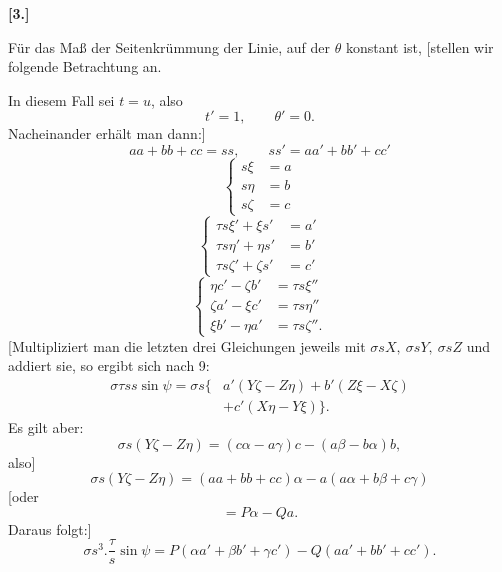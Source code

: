 %

\begin{center}\bfseries [3.]\end{center}
\noindent\hspace*{1.2em}Für das Maß der Seitenkrümmung der Linie, auf der $\theta$ konstant ist, [stellen wir folgende Betrachtung an.

In diesem Fall sei $t=u$, also
\[
t'=1,\qquad \theta'=0.
\]
Nacheinander erhält man dann:]
\begin{equation}\tag*{[$5'$]}
aa+bb+cc=ss,\qquad ss'=aa'+bb'+cc'
\end{equation}
\begin{equation}\tag*{[$4'$]}
\left\{\begin{aligned}s\xi&=a\\s\eta&=b\\s\zeta&=c\end{aligned}\right.
\end{equation}
\begin{equation}\tag*{[$12'$]}
\left\{\begin{aligned}
\tau s\xi'+\xi s'&=a'\\
\tau s\eta'+\eta s'&=b'\\
\tau s\zeta'+\zeta s'&=c'
\end{aligned}\right.
\end{equation}
\begin{equation}\tag*{[$8'$]}
\left\{\begin{aligned}
\eta c'-\zeta b'&=\tau s\xi''\\
\zeta a'-\xi c'&=\tau s\eta''\\
\xi b'-\eta a'&=\tau s\zeta''.
\end{aligned}\right.
\end{equation}
[Multipliziert man die letzten drei Gleichungen jeweils mit $\sigma sX,\ \sigma sY,\ \sigma sZ$ und addiert sie, so ergibt sich nach 9:
\[
\begin{aligned}
\sigma\tau ss\sin\psi=\sigma s\{&a'(Y\zeta-Z\eta)+b'(Z\xi-X\zeta)\\
&+c'(X\eta-Y\xi)\}.
\end{aligned}
\]
Es gilt aber:
\[
\sigma s(Y\zeta-Z\eta)=(c\alpha-a\gamma)c-(a\beta-b\alpha)b,
\]
also]
\[
\sigma s(Y\zeta-Z\eta)=(aa+bb+cc)\alpha-a(a\alpha+b\beta+c\gamma)
\]
[oder
\[
=P\alpha-Qa.
\]
Daraus folgt:]
\[
\sigma s^3.\frac{\tau}{s}\sin\psi=P(\alpha a'+\beta b'+\gamma c')-Q(aa'+bb'+cc').
\]
